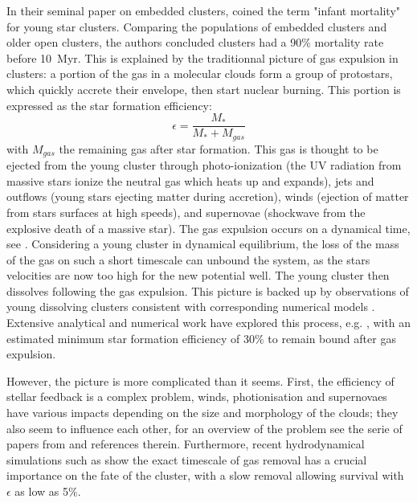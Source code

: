 In their seminal paper on embedded clusters, \cite{Lada2003} coined the term "infant mortality" for young star clusters. Comparing the populations of embedded clusters and older open clusters, the authors concluded clusters had a 90\% mortality rate before 10~Myr. This is explained by the traditionnal picture of gas expulsion in clusters: a portion of the gas in a molecular clouds form a group of protostars, which quickly accrete their envelope, then start nuclear burning. This portion is expressed as the star formation efficiency:
\begin{equation}
\epsilon = \frac{M_*}{M_* + M_{gas}}
\end{equation} 
with $M_{gas}$ the remaining gas after star formation. This gas is thought to be ejected from the young cluster through photo-ionization (the UV radiation from massive stars ionize the neutral gas which heats up and expands), jets and outflows (young stars ejecting matter during accretion), winds (ejection of matter from stars surfaces at high speeds), and supernovae (shockwave from the explosive death of a massive star). The gas expulsion occurs on a dynamical time, see \cite{Goodwin1997}. Considering a young cluster in dynamical equilibrium, the loss of the mass of the gas on such a short timescale can unbound the system, as the stars velocities are now too high for the new potential well. The young cluster then dissolves following the gas expulsion.
This picture is backed up by observations of young dissolving clusters \citep{Bastian2006} consistent with corresponding numerical models \citep{Goodwin2006}. Extensive analytical and numerical work have explored this process, e.g. \cite{Tutukov1978,Boily2003a,Boily2003b}, with an estimated minimum star formation efficiency of 30\% to remain bound after gas expulsion.

However, the picture is more complicated than it seems. First, the efficiency of stellar feedback is a complex problem, winds, photionisation and supernovaes have various impacts depending on the size and morphology of the clouds; they also seem to influence each other, for an overview of the problem see the serie of papers from \cite{Dale2011,Dale2013} and references therein. Furthermore, recent hydrodynamical simulations such as \cite{Pelupessy2012} show the exact timescale of gas removal has a crucial importance on the fate of the cluster, with a slow removal allowing survival with $\epsilon$ as low as 5\%.




